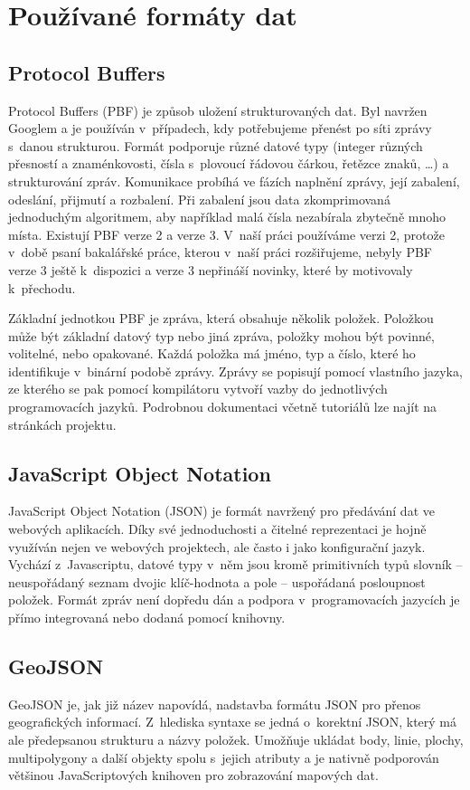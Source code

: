 \section{Používané formáty dat}

\subsection{Protocol Buffers}
Protocol Buffers (PBF)\cite{PBF} je způsob uložení strukturovaných dat. Byl navržen
Googlem a je používán v~případech, kdy potřebujeme přenést po síti zprávy
s~danou strukturou. Formát podporuje různé datové typy (integer různých přesností
a znaménkovosti, čísla s~plovoucí řádovou čárkou, řetězce znaků, \dots) a
strukturování zpráv. Komunikace probíhá ve fázích naplnění zprávy, její
zabalení, odeslání, přijmutí a rozbalení. Při zabalení jsou data zkomprimovaná
jednoduchým algoritmem, aby například malá čísla nezabírala zbytečně mnoho
místa. Existují PBF verze 2 a verze 3. V~naší práci používáme verzi 2, protože
v~době psaní bakalářské práce, kterou v~naší práci rozšiřujeme, nebyly PBF verze 3
ještě k~dispozici a verze 3 nepřináší novinky, které by motivovaly k~přechodu.

Základní jednotkou PBF je zpráva, která obsahuje několik položek. Položkou může
být základní datový typ nebo jiná zpráva, položky mohou být povinné, volitelné,
nebo opakované. Každá položka má jméno, typ a číslo, které ho identifikuje
v~binární podobě zprávy. Zprávy se popisují pomocí vlastního jazyka, ze kterého se
pak pomocí kompilátoru vytvoří vazby do jednotlivých programovacích jazyků. 
Podrobnou dokumentaci včetně tutoriálů lze najít na stránkách projektu.\cite{PBF}

\subsection{JavaScript Object Notation}
JavaScript Object Notation\cite{JSON} (JSON) je formát navržený pro předávání dat ve
webových aplikacích. Díky své jednoduchosti a čitelné reprezentaci je hojně
využíván nejen ve webových projektech, ale často i jako konfigurační jazyk.
Vychází z~Javascriptu, datové typy v~něm jsou kromě primitivních typů slovník --
neuspořádaný seznam dvojic klíč-hodnota a pole -- uspořádaná posloupnost
položek. Formát zpráv není dopředu dán a podpora v~programovacích jazycích je
přímo integrovaná nebo dodaná pomocí knihovny. 

\subsection{GeoJSON}
GeoJSON\cite{GeoJSON} je, jak již název napovídá, nadstavba formátu JSON pro přenos
geografických informací. Z~hlediska syntaxe se jedná o~korektní JSON, který má
ale předepsanou strukturu a názvy položek. Umožňuje ukládat body, linie, plochy,
multipolygony a další objekty spolu s~jejich atributy a je nativně podporován
většinou JavaScriptových knihoven pro zobrazování mapových dat.

